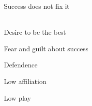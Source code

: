 \documentclass[aspectratio=169]{beamer}
\begin{document}
\begin{frame}
  \begin{center}
    \Huge Success does not fix it
    \\ \small \cite{clanceimes78}
    \\ \small \cite{sakulku11}
  \end{center}
\end{frame}

\begin{frame}
  \begin{center}
    \Huge Desire to be the best
    \\ \small \cite{sakulku11}
  \end{center}
\end{frame}

\begin{frame}
  \begin{center}
    \Huge Fear and guilt about success
    \\ \small \cite{sakulku11}
  \end{center}
\end{frame}

\begin{frame}
  \begin{center}
    \Huge Defendence
    \\ \small \cite{langford93}
  \end{center}
\end{frame}

\begin{frame}
  \begin{center}
    \Huge Low affiliation
    \\ \small \cite{langford93}
  \end{center}
\end{frame}

\begin{frame}
  \begin{center}
    \Huge Low play
    \\ \small \cite{langford93}
  \end{center}
\end{frame}
\end{document}
